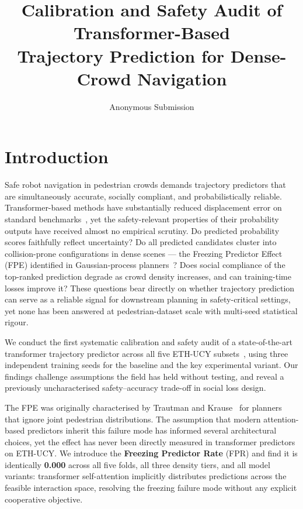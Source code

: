 \documentclass{article}
\title{Calibration and Safety Audit of Transformer-Based\\
       Trajectory Prediction for Dense-Crowd Navigation}
\author{Anonymous Submission}
\date{}
\begin{document}
\maketitle

\section{Introduction}
\label{sec:intro}

Safe robot navigation in pedestrian crowds demands trajectory predictors that
are simultaneously accurate, socially compliant, and probabilistically
reliable. Transformer-based methods have substantially reduced displacement
error on standard benchmarks~\cite{shi2023tutr,mohamed2020social}, yet the
safety-relevant properties of their probability outputs have received almost
no empirical scrutiny. Do predicted probability scores faithfully reflect
uncertainty? Do all predicted candidates cluster into collision-prone
configurations in dense scenes --- the Freezing Predictor Effect (FPE)
identified in Gaussian-process planners~\cite{trautman2010unfreezing}? Does
social compliance of the top-ranked prediction degrade as crowd density
increases, and can training-time losses improve it? These questions bear
directly on whether trajectory prediction can serve as a reliable signal for
downstream planning in safety-critical settings, yet none has been answered
at pedestrian-dataset scale with multi-seed statistical rigour.

We conduct the first systematic calibration and safety audit of a
state-of-the-art transformer trajectory predictor across all five
ETH-UCY subsets~\cite{pellegrini2009eth,lerner2007ucy}, using three
independent training seeds for the baseline and the key experimental
variant. Our findings challenge assumptions the field has held without
testing, and reveal a previously uncharacterised safety--accuracy trade-off
in social loss design.

The FPE was originally characterised by Trautman and
Krause~\cite{trautman2010unfreezing} for planners that ignore joint
pedestrian distributions. The assumption that modern attention-based
predictors inherit this failure mode has informed several architectural
choices, yet the effect has never been directly measured in transformer
predictors on ETH-UCY. We introduce the \textbf{Freezing Predictor Rate}
(FPR) and find it is identically \textbf{0.000} across all five folds, all
three density tiers, and all model variants: transformer self-attention
implicitly distributes predictions across the feasible interaction space,
resolving the freezing failure mode without any explicit cooperative
objective.
\end{document}
